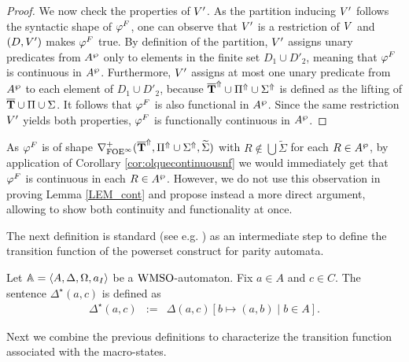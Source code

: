 \begin{proof}
We now check the properties of $V'$. As the partition inducing $V'$ follows the syntactic shape of $\varphi^{F}$, one can observe that $V'$ is a restriction of $V$ and $(D,V')$ makes $\varphi^{F}$ true. By definition of the partition, $V'$ assigns unary predicates from $A^{\wp}$ only to elements in the finite set $D_1 \cup D'_2$, meaning that $\varphi^{F}$ is continuous in $A^{\wp}$. Furthermore, $V'$ assigns at most one unary predicate from $A^{\wp}$ to each element of $D_1 \cup D'_2$, because $\overline{{\mathbf{T}}}^{\Uparrow} \cup \Pi^{\Uparrow} \cup \Sigma^{\Uparrow}$ is defined as the lifting of $\overline{{\mathbf{T}}} \cup \Pi \cup \Sigma$. It follows that $\varphi^{F}$ is also functional in $A^{\wp}$. Since the same restriction $V'$ yields both properties, $\varphi^{F}$ is functionally continuous in $A^{\wp}$.
\end{proof}

\begin{remark} As $\varphi^{F}$ is of shape $\nabla^+_{\mathrm{FOE}^{\infty}}(\overline{{\mathbf{T}}}^{\Uparrow},\Pi^{\Uparrow} \cup \Sigma^{\Uparrow},\widetilde{\Sigma})$ with $R \not\in \bigcup\widetilde{\Sigma}$ for each $R \in A^{\wp}$, by application of Corollary \ref{cor:olquecontinuousnf} we would immediately get that $\varphi^{F}$ is continuous in each $R \in A^{\wp}$. However, we do not use this observation in proving Lemma \ref{LEM_cont} and propose instead a more direct argument, allowing to show both continuity and functionality at once.
\end{remark}

The next definition is standard (see e.g.  \cite{Walukiewicz96,Ven08}) as an intermediate step to define the transition function of the powerset construct for parity automata.

\begin{definition}\label{DEF_delta star} Let $\mathbb{A} = \langle{A,\Delta,\Omega,a_I}\rangle$ be a $\mathrm{WMSO}$-automaton. Fix $a \in A$ and $c \in C$. The sentence $\Delta^{\star}(a,c)$ is defined as
\begin{eqnarray*}
        \Delta^{\star}(a,c) &:=& \Delta(a,c)[b \mapsto (a,b) \mid b \in A].
      \end{eqnarray*}
\end{definition}

 Next we combine the previous definitions to characterize the transition function associated with the macro-states.

